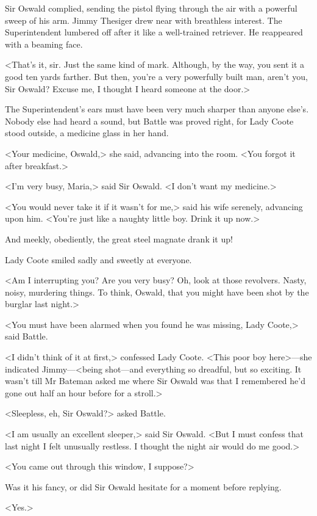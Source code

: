 Sir Oswald complied, sending the pistol flying through the air with a powerful sweep of his arm. Jimmy Thesiger drew near with breathless interest. The Superintendent lumbered off after it like a well-trained retriever. He reappeared with a beaming face.

<That's it, sir. Just the same kind of mark. Although, by the way, you sent it a good ten yards farther. But then, you're a very powerfully built man, aren't you, Sir Oswald? Excuse me, I thought I heard someone at the door.>

The Superintendent's ears must have been very much sharper than anyone else's. Nobody else had heard a sound, but Battle was proved right, for Lady Coote stood outside, a medicine glass in her hand.

<Your medicine, Oswald,> she said, advancing into the room. <You forgot it after breakfast.>

<I'm very busy, Maria,> said Sir Oswald. <I don't want my medicine.>

<You would never take it if it wasn't for me,> said his wife serenely, advancing upon him. <You're just like a naughty little boy. Drink it up now.>

And meekly, obediently, the great steel magnate drank it up!

Lady Coote smiled sadly and sweetly at everyone.

<Am I interrupting you? Are you very busy? Oh, look at those revolvers. Nasty, noisy, murdering things. To think, Oswald, that you might have been shot by the burglar last night.>

<You must have been alarmed when you found he was missing, Lady Coote,> said Battle.

<I didn't think of it at first,> confessed Lady Coote. <This poor boy here>—she indicated Jimmy—<being shot—and everything so dreadful, but so exciting. It wasn't till Mr Bateman asked me where Sir Oswald was that I remembered he'd gone out half an hour before for a stroll.>

<Sleepless, eh, Sir Oswald?> asked Battle.

<I am usually an excellent sleeper,> said Sir Oswald. <But I must confess that last night I felt unusually restless. I thought the night air would do me good.>

<You came out through this window, I suppose?>

Was it his fancy, or did Sir Oswald hesitate for a moment before replying.

<Yes.>

